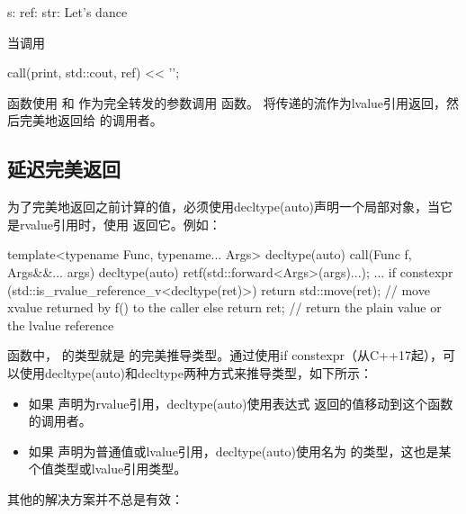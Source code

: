 \begin{outputcode}
s:
ref:
str: Let's dance
\end{outputcode}

当调用

\begin{cppcode}
call(print, std::cout, ref) << '\n';
\end{cppcode}

函数使用  和  作为完全转发的参数调用  函数。 将传递的流作为lvalue引用返回，然后完美地返回给  的调用者。

\subsection{延迟完美返回}

为了完美地返回之前计算的值，必须使用decltype(auto)声明一个局部对象，当它是rvalue引用时，使用  返回它。例如：

\begin{cppcode}
template<typename Func, typename... Args>
decltype(auto) call(Func f, Args&&... args)
{
	decltype(auto) ret{f(std::forward<Args>(args)...)};
	...
	if constexpr (std::is_rvalue_reference_v<decltype(ret)>) {
		return std::move(ret); // move xvalue returned by f() to the caller
	}
	else {
		return ret; // return the plain value or the lvalue reference
	}
}
\end{cppcode}

函数中， 的类型就是  的完美推导类型。通过使用if constexpr（从C++17起），可以使用decltype(auto)和decltype两种方式来推导类型，如下所示：

\begin{itemize}
	\item 如果  声明为rvalue引用，decltype(auto)使用表达式  返回的值移动到这个函数的调用者。
	\item 如果  声明为普通值或lvalue引用，decltype(auto)使用名为  的类型，这也是某个值类型或lvalue引用类型。
\end{itemize}

其他的解决方案并不总是有效：

